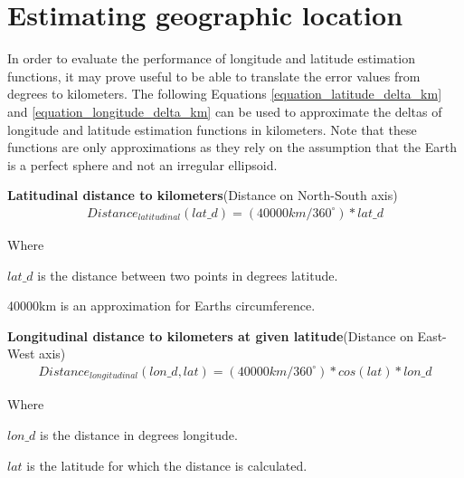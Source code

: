 \chapter{Estimating geographic location}
\label{chapter_est_geoloc}
In order to evaluate the performance of longitude and latitude estimation functions, it may prove useful to be able to translate the error values from degrees to kilometers. The following Equations \ref{equation_latitude_delta_km} and \ref{equation_longitude_delta_km} can be used to approximate the deltas of longitude and latitude estimation functions in kilometers. Note that these functions are only approximations as they rely on the assumption that the Earth is a perfect sphere and not an irregular ellipsoid.


\hfill \break
\noindent\textbf{Latitudinal distance to kilometers}(Distance on North-South axis)
%
\begin{equation}
\begin{split}
\label{equation_latitude_delta_km}
Distance_{latitudinal}(lat\_d)=(40 000km/360^\circ)* lat\_d
\end{split}
\end{equation}

\noindent Where 

$lat\_d$ is the distance between two points in degrees latitude.

40000km is an approximation for Earths circumference.

\vspace{5mm} %

\noindent\textbf{Longitudinal distance to kilometers at given latitude}(Distance on East-West axis)
%
\begin{equation}
\begin{split}
\label{equation_longitude_delta_km}
Distance_{longitudinal}(lon\_d, lat)=(40 000km/360^\circ)* cos(lat)*lon\_d
\end{split}
\end{equation}

\noindent Where 

$lon\_d$ is the distance in degrees longitude.

$lat$ is the latitude for which the distance is calculated.



